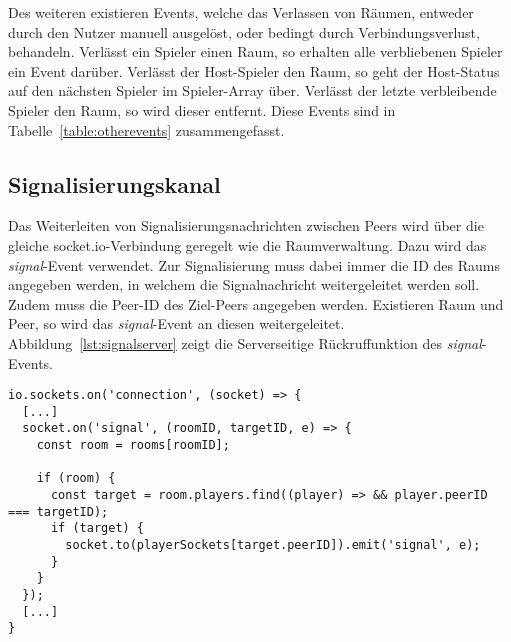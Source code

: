 Des weiteren existieren Events, welche das Verlassen von Räumen, entweder durch den Nutzer manuell ausgelöst, oder bedingt durch Verbindungsverlust, behandeln. Verlässt ein Spieler einen Raum, so erhalten alle verbliebenen Spieler ein Event darüber. Verlässt der Host-Spieler den Raum, so geht der Host-Status auf den nächsten Spieler im Spieler-Array über. Verlässt der letzte verbleibende Spieler den Raum, so wird dieser entfernt. Diese Events sind in Tabelle~\ref{table:otherevents} zusammengefasst.\par

\subsection{Signalisierungskanal}
\label{section:signalisierungskanal}
Das Weiterleiten von Signalisierungsnachrichten zwischen Peers wird über die gleiche socket.io-Verbindung geregelt wie die Raumverwaltung. Dazu wird das \textit{signal}-Event verwendet. Zur Signalisierung muss dabei immer die ID des Raums angegeben werden, in welchem die Signalnachricht weitergeleitet werden soll. Zudem muss die Peer-ID des Ziel-Peers angegeben werden. Existieren Raum und Peer, so wird das \textit{signal}-Event an diesen weitergeleitet. Abbildung~\ref{lst:signalserver} zeigt die Serverseitige Rückruffunktion des \textit{signal}-Events.

\vspace{11pt}
\lstset{language=js, style=STYLE_CODE_JS}
\begin{singlespace}
\begin{minipage}{\textwidth}
\begin{lstlisting}[caption={Event zum Weiterleiten eines Signals -- Server.js}, captionpos=b, label={lst:signalserver}]
io.sockets.on('connection', (socket) => {
  [...]
  socket.on('signal', (roomID, targetID, e) => {
    const room = rooms[roomID];

    if (room) {
      const target = room.players.find((player) => && player.peerID === targetID);
      if (target) {
        socket.to(playerSockets[target.peerID]).emit('signal', e);
      }
    }
  });
  [...]
}
\end{lstlisting}
\end{minipage}
\end{singlespace}

